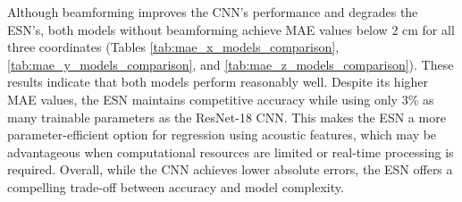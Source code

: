 Although beamforming improves the CNN's performance and degrades the ESN's, both models without beamforming achieve MAE values below 2 cm for all three coordinates (Tables \ref{tab:mae_x_models_comparison}, \ref{tab:mae_y_models_comparison}, and \ref{tab:mae_z_models_comparison}). These results indicate that both models perform reasonably well. Despite its higher MAE values, the ESN maintains competitive accuracy while using only 3\% as many trainable parameters as the ResNet-18 CNN. This makes the ESN a more parameter-efficient option for regression using acoustic features, which may be advantageous when computational resources are limited or real-time processing is required. Overall, while the CNN achieves lower absolute errors, the ESN offers a compelling trade-off between accuracy and model complexity.













































